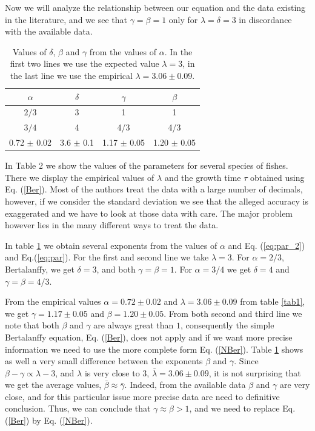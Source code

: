 Now we will analyze the relationship between our equation and the data existing in the literature, and we see that $\gamma= \beta=1$ only for $\lambda=\delta=3$ in discordance with the available data.

\begin{table}
\centering
\begin{tabular}{|c|c|c|c|}
\hline
$\alpha$        & $\delta$   & $\gamma$   & $\beta$    \\
\hline
$2/3$       & 3          & 1          & 1          \\
$3/4$       & 4          & 4/3          & 4/3        \\
0.72 $\pm$ 0.02 & 3.6 $\pm$ 0.1& 1.17 $\pm$ 0.05& 1.20 $\pm$ 0.05\\
\hline
\end{tabular}
\caption{Values of $\delta$, $\beta$ and $\gamma$  from the values of  $\alpha$. In the first two lines we use the expected value $\lambda=3$, in the last line we use the empirical $\lambda=3.06 \pm 0.09$.}
\label{tablegamma}
\end{table}

In Table 2 we show the values of the parameters for several species of fishes. There we display the empirical values of $\lambda$ and the growth time $\tau$ obtained using  Eq. (\ref{Ber}). Most of the authors treat the data with a  large number of decimals, however,   if we consider the standard deviation we see that the alleged accuracy is exaggerated and we have to look at those data with care. The major problem however lies in the many different ways to treat the data.

In table \ref{tablegamma} we obtain several exponents from the values of $\alpha$ and Eq. (\ref{eq:par_2}) and Eq.(\ref{eq:par}).   For the first and second line we take $\lambda=3$. For $\alpha=2/3$, Bertalanffy, we get $\delta=3$, and both
$\gamma=\beta=1$. For $\alpha=3/4$  we get $\delta=4$ and  $\gamma=\beta=4/3$.

From the empirical values $\alpha=0.72 \pm 0.02$ and $\lambda=3.06 \pm 0.09$  from table  \ref{tab1}, we get $\gamma=1.17 \pm 0.05$ and $\beta=1.20 \pm 0.05$.
From both second and third line  we note that both $\beta$ and $\gamma$ are always great than $1$, consequently the simple Bertalanffy equation, Eq. (\ref{Ber}), does not apply and if we want more precise information we need to use the more complete form Eq. (\ref{NBer}). Table \ref{tablegamma} shows as well a very small difference between the exponents $\beta$ and  $\gamma$.   Since  $\beta-\gamma \propto \lambda-3$,  and  $\lambda$ is very close to $3$, $\bar{\lambda} = 3.06 \pm 0.09$,  it is not surprising that we get the average values,  $\bar{\beta} \approx \bar{\gamma}$. Indeed, from the available data $\beta$ and $\gamma$ are very close, and for this particular issue more precise data are need to definitive conclusion. Thus, we can conclude that $\gamma \approx \beta > 1$, and we need to replace  Eq. (\ref{Ber}) by Eq. (\ref{NBer}).

